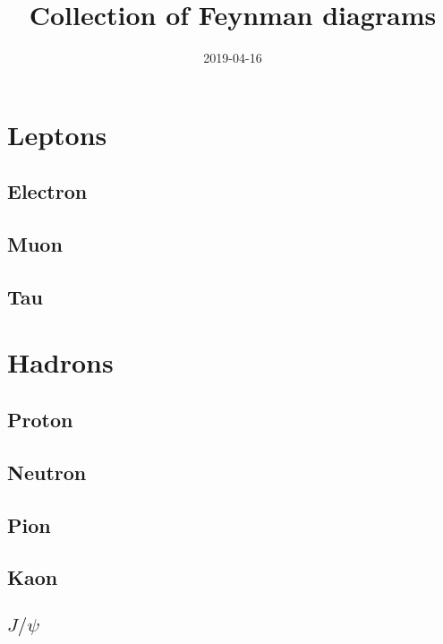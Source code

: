 \documentclass{report}
\title{Collection of Feynman diagrams}
\date{2019-04-16}
\begin{document}
\section{Leptons}

\subsection{Electron}

\subsection{Muon}

\subsection{Tau}



\section{Hadrons}

\subsection{Proton}

\subsection{Neutron}

\subsection{Pion}

\subsection{Kaon}

\subsection{$J/\psi$}
\end{document}
